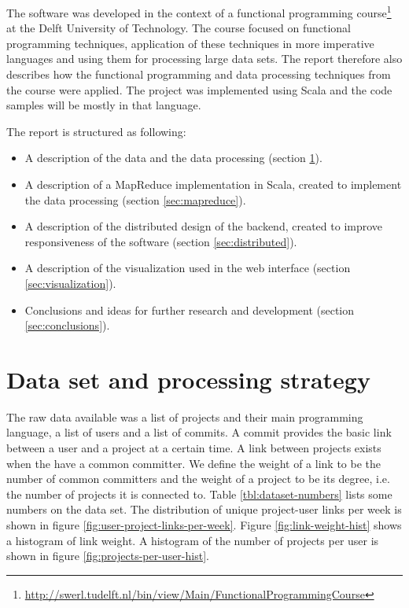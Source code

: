 \documentclass[10pt,a4paper]{article}
\begin{document}
The software was developed in the context of a functional programming course\footnote{\url{http://swerl.tudelft.nl/bin/view/Main/FunctionalProgrammingCourse}} at the Delft University of Technology. The course focused on functional programming techniques, application of these techniques in more imperative languages and using them for processing large data sets. The report therefore also describes how the functional programming and data processing techniques from the course were applied. The project was implemented using Scala and the code samples will be mostly in that language.

The report is structured as following:
\begin{itemize}
    \item A description of the data and the data processing (section \ref{sec:data}).
    \item A description of a MapReduce implementation in Scala, created to implement the data processing (section \ref{sec:mapreduce}).
    \item A description of the distributed design of the backend, created to improve responsiveness of the software (section \ref{sec:distributed}).
    \item A description of the visualization used in the web interface (section \ref{sec:visualization}).
    \item Conclusions and ideas for further research and development (section \ref{sec:conclusions}).
\end{itemize}

\section{Data set and processing strategy}\label{sec:data}

The raw data available was a list of projects and their main programming language, a list of users and a list of commits. A commit provides the basic link between a user and a project at a certain time. A link between projects exists when the have a common committer. We define the weight of a link to be the number of common committers and the weight of a project to be its degree, i.e. the number of projects it is connected to. Table \ref{tbl:dataset-numbers} lists some numbers on the data set. The distribution of unique project-user links per week is shown in figure \ref{fig:user-project-links-per-week}. Figure \ref{fig:link-weight-hist} shows a histogram of link weight. A histogram of the number of projects per user is shown in figure \ref{fig:projects-per-user-hist}.
\end{document}
